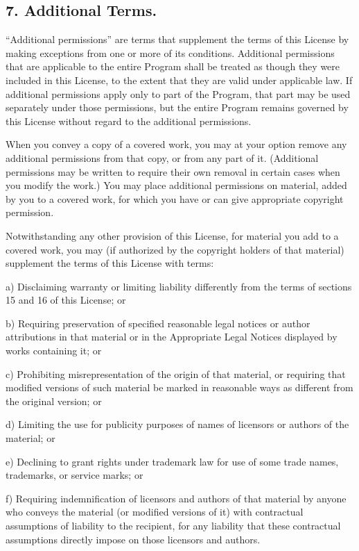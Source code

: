 \subsection{7. Additional Terms.}
“Additional permissions” are terms that supplement the terms of this License by making exceptions from one or more of its conditions. Additional permissions that are applicable to the entire Program shall be treated as though they were included in this License, to the extent that they are valid under applicable law. If additional permissions apply only to part of the Program, that part may be used separately under those permissions, but the entire Program remains governed by this License without regard to the additional permissions.\par
When you convey a copy of a covered work, you may at your option remove any additional permissions from that copy, or from any part of it. (Additional permissions may be written to require their own removal in certain cases when you modify the work.) You may place additional permissions on material, added by you to a covered work, for which you have or can give appropriate copyright permission.\par
Notwithstanding any other provision of this License, for material you add to a covered work, you may (if authorized by the copyright holders of that material) supplement the terms of this License with terms:\par
a) Disclaiming warranty or limiting liability differently from the terms of sections 15 and 16 of this License; or\par
b) Requiring preservation of specified reasonable legal notices or author attributions in that material or in the Appropriate Legal Notices displayed by works containing it; or\par
c) Prohibiting misrepresentation of the origin of that material, or requiring that modified versions of such material be marked in reasonable ways as different from the original version; or\par
d) Limiting the use for publicity purposes of names of licensors or authors of the material; or\par
e) Declining to grant rights under trademark law for use of some trade names, trademarks, or service marks; or\par
f) Requiring indemnification of licensors and authors of that material by anyone who conveys the material (or modified versions of it) with contractual assumptions of liability to the recipient, for any liability that these contractual assumptions directly impose on those licensors and authors.\par
